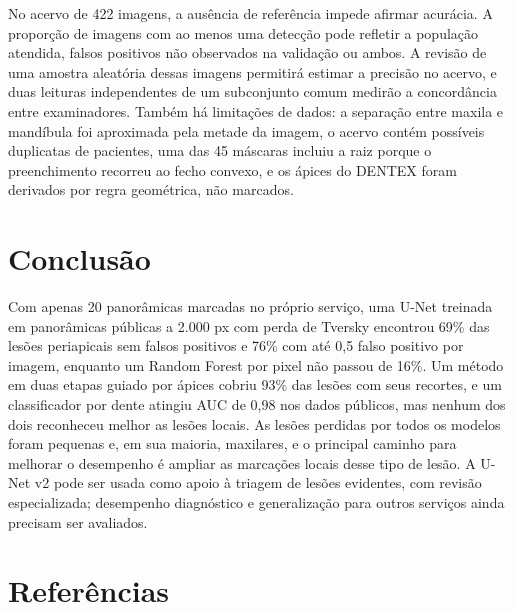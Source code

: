 \documentclass[twocolumn]{article}
\begin{document}
No acervo de 422 imagens, a ausência de referência impede afirmar acurácia. A proporção de imagens com ao menos uma detecção pode refletir a população atendida, falsos positivos não observados na validação ou ambos. A revisão de uma amostra aleatória dessas imagens permitirá estimar a precisão no acervo, e duas leituras independentes de um subconjunto comum medirão a concordância entre examinadores. Também há limitações de dados: a separação entre maxila e mandíbula foi aproximada pela metade da imagem, o acervo contém possíveis duplicatas de pacientes, uma das 45 máscaras incluiu a raiz porque o preenchimento recorreu ao fecho convexo, e os ápices do DENTEX foram derivados por regra geométrica, não marcados.

\section{Conclusão}

Com apenas 20 panorâmicas marcadas no próprio serviço, uma U-Net treinada em panorâmicas públicas a 2.000 px com perda de Tversky encontrou 69\% das lesões periapicais sem falsos positivos e 76\% com até 0,5 falso positivo por imagem, enquanto um Random Forest por pixel não passou de 16\%. Um método em duas etapas guiado por ápices cobriu 93\% das lesões com seus recortes, e um classificador por dente atingiu AUC de 0,98 nos dados públicos, mas nenhum dos dois reconheceu melhor as lesões locais. As lesões perdidas por todos os modelos foram pequenas e, em sua maioria, maxilares, e o principal caminho para melhorar o desempenho é ampliar as marcações locais desse tipo de lesão. A U-Net v2 pode ser usada como apoio à triagem de lesões evidentes, com revisão especializada; desempenho diagnóstico e generalização para outros serviços ainda precisam ser avaliados.

\balance
\section*{Referências}
\end{document}
